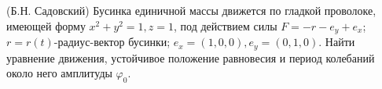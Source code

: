 (Б.Н. Садовский)
Бусинка единичной массы движется по гладкой проволоке, имеющей
форму $x^2+y^2=1,z=1$, под действием силы $F=-r-e_y+e_x$;
$r=r(t)$-радиус-вектор бусинки; $e_x=(1,0,0),e_y=(0,1,0)$. Найти уравнение
движения, устойчивое положение равновесия и период колебаний около
него амплитуды $\varphi_0$.
